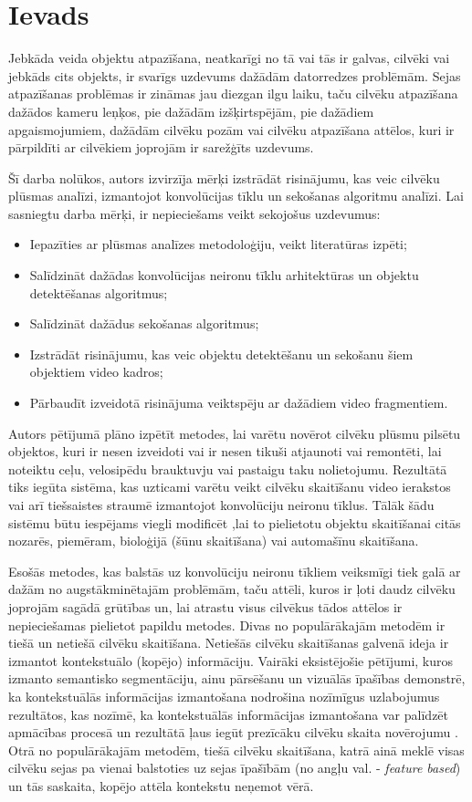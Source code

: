 \chapter{Ievads}
Jebkāda veida objektu atpazīšana, neatkarīgi no tā vai tās ir galvas, cilvēki vai jebkāds cits objekts, ir svarīgs uzdevums dažādām datorredzes problēmām. Sejas atpazīšanas problēmas ir zināmas jau diezgan ilgu laiku, taču cilvēku atpazīšana dažādos kameru leņķos, pie dažādām izšķirtspējām, pie dažādiem apgaismojumiem, dažādām cilvēku pozām vai cilvēku atpazīšana attēlos, kuri ir pārpildīti ar cilvēkiem joprojām ir sarežģīts uzdevums.

Šī darba nolūkos, autors izvirzīja mērķi izstrādāt risinājumu, kas veic cilvēku plūsmas analīzi, izmantojot konvolūcijas tīklu un sekošanas algoritmu analīzi. Lai sasniegtu darba mērķi, ir nepieciešams veikt sekojošus uzdevumus:
\begin{itemize}
	\item Iepazīties ar plūsmas analīzes metodoloģiju, veikt literatūras izpēti;	
	\item Salīdzināt dažādas konvolūcijas neironu tīklu arhitektūras un objektu detektēšanas algoritmus;
	\item Salīdzināt dažādus sekošanas algoritmus;
	\item Izstrādāt risinājumu, kas veic objektu detektēšanu un sekošanu šiem objektiem video kadros;
	\item Pārbaudīt izveidotā risinājuma veiktspēju ar dažādiem video fragmentiem.	
\end{itemize}

Autors pētījumā plāno izpētīt metodes, lai varētu novērot cilvēku plūsmu pilsētu objektos, kuri ir nesen izveidoti vai ir nesen tikuši atjaunoti vai remontēti, lai noteiktu ceļu, velosipēdu brauktuvju vai pastaigu taku nolietojumu. Rezultātā tiks iegūta sistēma, kas uzticami varētu veikt cilvēku skaitīšanu video ierakstos vai arī tiešsaistes straumē izmantojot konvolūciju neironu tīklus. Tālāk šādu sistēmu būtu iespējams viegli modificēt ,lai to pielietotu objektu skaitīšanai citās nozarēs, piemēram, bioloģijā (šūnu skaitīšana) vai automašīnu skaitīšana.

Esošās metodes, kas balstās uz konvolūciju neironu tīkliem veiksmīgi tiek galā ar dažām no augstākminētajām problēmām, taču attēli, kuros ir ļoti daudz cilvēku joprojām sagādā grūtības un, lai atrastu visus cilvēkus tādos attēlos ir nepieciešamas pielietot papildu metodes. Divas no populārākajām metodēm ir tiešā un netiešā cilvēku skaitīšana. Netiešās cilvēku skaitīšanas galvenā ideja ir izmantot kontekstuālo (kopējo) informāciju. Vairāki eksistējošie pētījumi, kuros izmanto semantisko segmentāciju, ainu pārsēšanu un vizuālās īpašības demonstrē, ka kontekstuālās informācijas izmantošana nodrošina nozīmīgus uzlabojumus rezultātos, kas nozīmē, ka kontekstuālās informācijas izmantošana var palīdzēt apmācības procesā un rezultātā ļaus iegūt prezīcāku cilvēku skaita novērojumu \cite{sindagi2017generating}.
Otrā no populārākajām metodēm, tiešā cilvēku skaitīšana, katrā ainā meklē visas cilvēku sejas pa vienai balstoties uz sejas īpašībām (no angļu val. - \textit{feature based}) un tās saskaita, kopējo attēla kontekstu neņemot vērā. 

